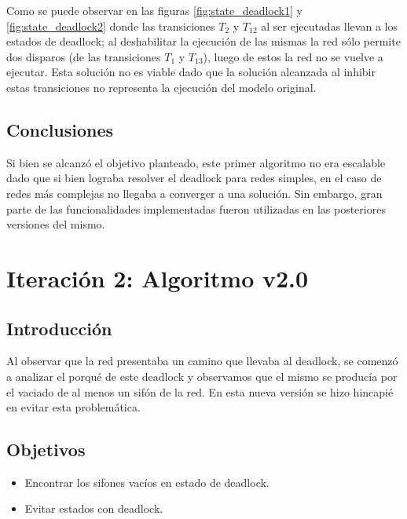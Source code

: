 Como se puede observar en las figuras \ref{fig:state_deadlock1} y \ref{fig:state_deadlock2} donde las transiciones $T_2$ y $T_{12}$ al ser ejecutadas llevan a los estados de deadlock; al deshabilitar la ejecución de las mismas la red sólo permite dos disparos (de las transiciones $T_1$ y $T_{13}$), luego de estos la red no se vuelve a ejecutar.
Esta solución no es viable dado que la solución alcanzada al inhibir estas transiciones no representa la ejecución del modelo original.

\subsection{Conclusiones}
Si bien se alcanzó el objetivo planteado, este primer algoritmo no era escalable dado que si bien lograba resolver el deadlock para redes simples, en el caso de redes más complejas no llegaba a converger a una solución. 
Sin embargo, gran parte de las funcionalidades implementadas fueron utilizadas en las posteriores versiones del mismo.
\bigskip


\section{Iteración 2: Algoritmo v2.0}
\subsection{Introducción}
Al observar que la red presentaba un camino que llevaba al deadlock, se comenzó a analizar el porqué de este deadlock y observamos que el mismo se producía por el vaciado de al menos un sifón de la red. En esta nueva versión se hizo hincapié en evitar esta problemática.

\subsection{Objetivos}
\begin{itemize}
	\item Encontrar los sifones vacíos en estado de deadlock.
	\item Evitar estados con deadlock.
\end{itemize}

